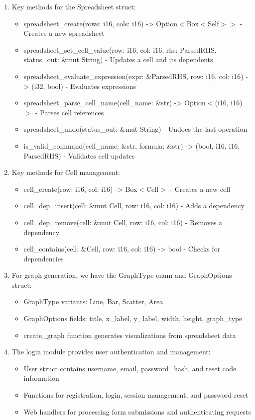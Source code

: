 \documentclass[10pt,a4paper]{article}  %
\begin{document}
\begin{enumerate}
\item Key methods for the Spreadsheet struct:
\begin{itemize}
    \item spreadsheet\_create(rows: i16, cols: i16) -> Option$<$Box$<$Self$>$$>$ - Creates a new spreadsheet
    \item spreadsheet\_set\_cell\_value(row: i16, col: i16, rhs: ParsedRHS, status\_out: \&mut String) - Updates a cell and its dependents
    \item spreadsheet\_evaluate\_expression(expr: \&ParsedRHS, row: i16, col: i16) -> (i32, bool) - Evaluates expressions
    \item spreadsheet\_parse\_cell\_name(cell\_name: \&str) -> Option$<$(i16, i16)$>$ - Parses cell references
    \item spreadsheet\_undo(status\_out: \&mut String) - Undoes the last operation
    \item is\_valid\_command(cell\_name: \&str, formula: \&str) -> (bool, i16, i16, ParsedRHS) - Validates cell updates
\end{itemize}

\item Key methods for Cell management:
\begin{itemize}
    \item cell\_create(row: i16, col: i16) -> Box$<$Cell$>$ - Creates a new cell
    \item cell\_dep\_insert(cell: \&mut Cell, row: i16, col: i16) - Adds a dependency
    \item cell\_dep\_remove(cell: \&mut Cell, row: i16, col: i16) - Removes a dependency
    \item cell\_contains(cell: \&Cell, row: i16, col: i16) -> bool - Checks for dependencies
\end{itemize}

\item For graph generation, we have the GraphType enum and GraphOptions struct:
\begin{itemize}
    \item GraphType variants: Line, Bar, Scatter, Area
    \item GraphOptions fields: title, x\_label, y\_label, width, height, graph\_type
    \item create\_graph function generates visualizations from spreadsheet data
\end{itemize}

\item The login module provides user authentication and management:
\begin{itemize}
    \item User struct contains username, email, password\_hash, and reset code information
    \item Functions for registration, login, session management, and password reset
    \item Web handlers for processing form submissions and authenticating requests
\end{itemize}


\end{enumerate}
\end{document}
